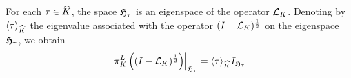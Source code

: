 \begin{lemma}
    For each $\tau \in \dualGroup\CompactGroup$,
    the space $\HilbertCompactGroup{\tau}$ is an eigenspace of the operator $\Laplacian[\CompactGroup]$.
    Denoting by $\JapaneseBracket{\CompactGroup}{\tau}$ the eigenvalue associated with the operator $\BesselPotential[\CompactGroup]{1}$ on the eigenspace $\HilbertCompactGroup\tau$, we obtain
    \begin{align*}
        \eval{\LeftRegularRepresentation\left(\BesselPotential[\CompactGroup]{1}\right)}{\HilbertCompactGroup\tau}
        = \JapaneseBracket{\CompactGroup}{\tau} \Id{\HilbertCompactGroup\tau}
    \end{align*}
\end{lemma}

%
%
